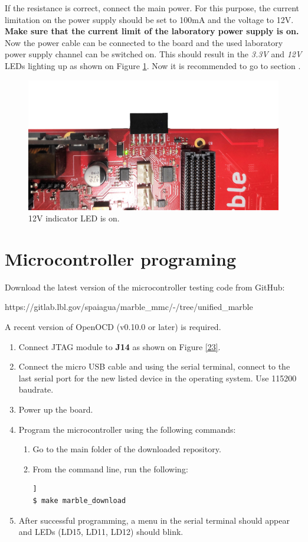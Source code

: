 \documentclass[12pt,oneside,a4]{article}
\begin{document}
If the resistance is correct, connect the main power. For this purpose, the current limitation on the power supply should be set to 100mA and the voltage to 12V. \textbf{Make sure that the current limit of the laboratory power supply is on.} Now the power cable can be connected to the board and the used laboratory power supply channel can be switched on.
This should result in the \textit{3.3V} and \textit{12V} LEDs lighting up as shown  on Figure \ref{02}. Now it is recommended to go to section .
\begin{figure}[H]
\begin{center}
\includegraphics[width=0.8\linewidth, angle = 180]{xrpoff.png}
 \caption{12V indicator LED is on. }\label{02}
\end{center}
\end{figure}

\section{Microcontroller programing}
\label{microcontroller}

Download the latest version of the microcontroller testing code from GitHub:
\begin{leftbar}
https://gitlab.lbl.gov/spaiagua/marble\_mmc/-/tree/unified\_marble
\end{leftbar}

A recent version of OpenOCD (v0.10.0 or later) is required.
\begin{enumerate}
	\item Connect JTAG module to \textbf{J14} as shown on Figure \ref{23}.
	\item Connect the micro USB cable and using the serial terminal, connect to the last serial port for the new listed device in the operating system. Use 115200 baudrate.
	\item Power up the board.
	\item Program the microcontroller using the following commands:
	\begin{enumerate}
	\item Go to the main folder of the downloaded repository.
	\item From the command line, run the following:
	\begin{lstlisting}[backgroundcolor = \color{Gainsboro}, language=bash, frame=none]]
$ make marble_download
	\end{lstlisting}
	\end{enumerate}
	\item After successful programming, a menu in the serial terminal should appear and LEDs (LD15, LD11, LD12) should blink.
\end{enumerate}
\end{document}

